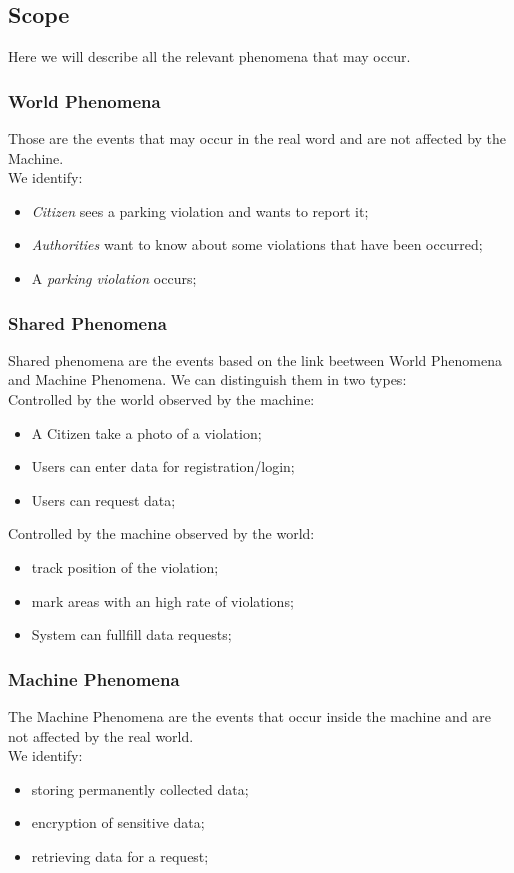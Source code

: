 \documentclass{article}
\begin{document}
\subsection{Scope}
Here we will describe all the relevant phenomena that may occur. 

\subsubsection{World Phenomena}
Those are the events that may occur in the real word and are not affected by the Machine.
\\We identify:
\begin{itemize}
    \item \textit{Citizen} sees a parking violation and wants to report it;
    \item \textit{Authorities} want to know about some violations that have been occurred;
    \item A \textit{parking violation} occurs; 
\end{itemize} 

\subsubsection{Shared Phenomena}
Shared phenomena are the events based on the link beetween World Phenomena and Machine Phenomena.
We can distinguish them in two types:
\\
Controlled by the world observed by the machine:
\begin{itemize}
    \item A Citizen take a photo of a violation;
    \item Users can enter data for registration/login;
    \item Users can request data;
\end{itemize}
Controlled by the machine observed by the world:
\begin{itemize}
    \item track position of the violation;
    \item mark areas with an high rate of violations;
    \item System can fullfill data requests;
\end{itemize}

\subsubsection{Machine Phenomena}
The Machine Phenomena are the events that occur inside the machine and are not affected by the real world.
\\We identify:
\begin{itemize}
    \item storing permanently collected data;
    \item encryption of sensitive data;
    \item retrieving data for a request; 
\end{itemize} 
\end{document}
